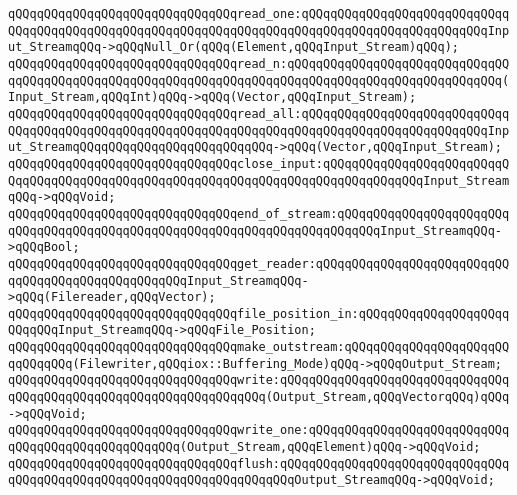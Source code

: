 \verb|qQQqqQQqqQQqqQQqqQQqqQQqqQQqqQQqread_one:qQQqqQQqqQQqqQQqqQQqqQQqqQQqqQQqqQQqqQQqqQQqqQQqqQQqqQQqqQQqqQQqqQQqqQQqqQQqqQQqqQQqqQQqqQQqqQQqInput_StreamqQQq->qQQqNull_Or(qQQq(Element,qQQqInput_Stream)qQQq);|\newline
\newline
\verb|qQQqqQQqqQQqqQQqqQQqqQQqqQQqqQQqread_n:qQQqqQQqqQQqqQQqqQQqqQQqqQQqqQQqqQQqqQQqqQQqqQQqqQQqqQQqqQQqqQQqqQQqqQQqqQQqqQQqqQQqqQQqqQQqqQQqqQQq(Input_Stream,qQQqInt)qQQq->qQQq(Vector,qQQqInput_Stream);|\newline
\verb|qQQqqQQqqQQqqQQqqQQqqQQqqQQqqQQqread_all:qQQqqQQqqQQqqQQqqQQqqQQqqQQqqQQqqQQqqQQqqQQqqQQqqQQqqQQqqQQqqQQqqQQqqQQqqQQqqQQqqQQqqQQqqQQqqQQqInput_StreamqQQqqQQqqQQqqQQqqQQqqQQqqQQq->qQQq(Vector,qQQqInput_Stream);|\newline
\newline
\verb|qQQqqQQqqQQqqQQqqQQqqQQqqQQqqQQqclose_input:qQQqqQQqqQQqqQQqqQQqqQQqqQQqqQQqqQQqqQQqqQQqqQQqqQQqqQQqqQQqqQQqqQQqqQQqqQQqqQQqqQQqInput_StreamqQQq->qQQqVoid;|\newline
\verb|qQQqqQQqqQQqqQQqqQQqqQQqqQQqqQQqend_of_stream:qQQqqQQqqQQqqQQqqQQqqQQqqQQqqQQqqQQqqQQqqQQqqQQqqQQqqQQqqQQqqQQqqQQqqQQqqQQqInput_StreamqQQq->qQQqBool;|\newline
\newline
\verb|qQQqqQQqqQQqqQQqqQQqqQQqqQQqqQQqget_reader:qQQqqQQqqQQqqQQqqQQqqQQqqQQqqQQqqQQqqQQqqQQqqQQqqQQqInput_StreamqQQq->qQQq(Filereader,qQQqVector);|\newline
\verb|qQQqqQQqqQQqqQQqqQQqqQQqqQQqqQQqfile_position_in:qQQqqQQqqQQqqQQqqQQqqQQqqQQqInput_StreamqQQq->qQQqFile_Position;|\newline
\newline
\newline
\newline
\verb|qQQqqQQqqQQqqQQqqQQqqQQqqQQqqQQqmake_outstream:qQQqqQQqqQQqqQQqqQQqqQQqqQQqqQQq(Filewriter,qQQqiox::Buffering_Mode)qQQq->qQQqOutput_Stream;|\newline
\newline
\verb|qQQqqQQqqQQqqQQqqQQqqQQqqQQqqQQqwrite:qQQqqQQqqQQqqQQqqQQqqQQqqQQqqQQqqQQqqQQqqQQqqQQqqQQqqQQqqQQqqQQqqQQq(Output_Stream,qQQqVectorqQQq)qQQq->qQQqVoid;|\newline
\verb|qQQqqQQqqQQqqQQqqQQqqQQqqQQqqQQqwrite_one:qQQqqQQqqQQqqQQqqQQqqQQqqQQqqQQqqQQqqQQqqQQqqQQqqQQq(Output_Stream,qQQqElement)qQQq->qQQqVoid;|\newline
\newline
\verb|qQQqqQQqqQQqqQQqqQQqqQQqqQQqqQQqflush:qQQqqQQqqQQqqQQqqQQqqQQqqQQqqQQqqQQqqQQqqQQqqQQqqQQqqQQqqQQqqQQqqQQqqQQqOutput_StreamqQQq->qQQqVoid;|\newline
